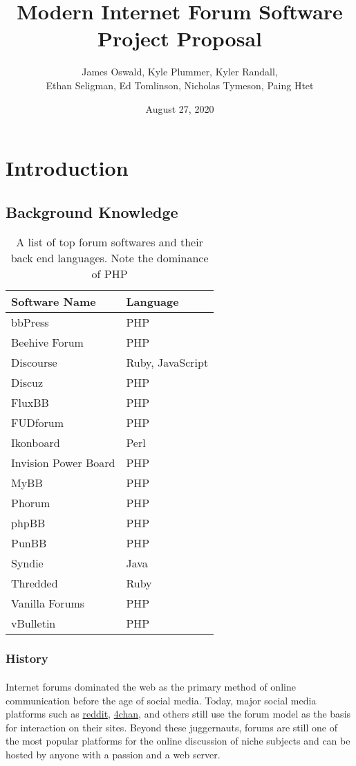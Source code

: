\documentclass[]{article}
\title{Modern Internet Forum Software \\ Project Proposal}
\author{James Oswald, Kyle Plummer, Kyler Randall, \\ Ethan Seligman, Ed Tomlinson, Nicholas Tymeson, Paing Htet}
\date{August 27, 2020}
\begin{document}
\maketitle
\thispagestyle{fancy}
\section{Introduction}
\subsection{Background Knowledge}

\begin{wraptable}{r}{5.5cm}

\begin{tabular}{|l|l|}

\hline
\textbf{Software Name} & \textbf{Language} \\
\hline
bbPress & PHP \\
Beehive Forum & PHP \\
Discourse & Ruby, JavaScript \\
Discuz & PHP \\
FluxBB & PHP \\
FUDforum & PHP \\
Ikonboard & Perl \\
Invision Power Board & PHP \\
MyBB & PHP \\
Phorum & PHP \\
phpBB & PHP \\
PunBB & PHP \\
Syndie & Java \\
Thredded & Ruby \\
Vanilla Forums & PHP \\
vBulletin & PHP \\
\hline
\end{tabular}
\captionsetup{belowskip=0pt}
\caption{A list of top forum softwares and their back end languages. Note the dominance of PHP}
\end{wraptable}
\subsubsection{History}
\paragraph{}
Internet forums dominated the web as the primary method of online communication before the age of social media. Today, major social media platforms such as \href{https://www.reddit.com/}{reddit}, \href{https://www.4channel.org/}{4chan}, and others still use the forum model as the basis for interaction on their sites. Beyond these juggernauts, forums are still one of the most popular platforms for the online discussion of niche subjects and can be hosted by anyone with a passion and a web server. 
\end{document}
